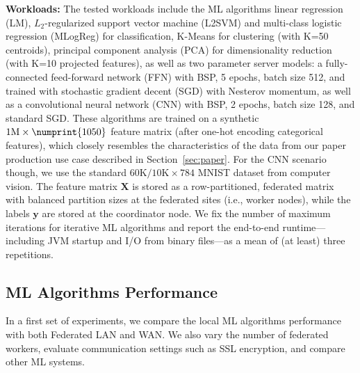 \documentclass[sigconf,screen]{acmart}
\newcommand{\mat}[1]{\ensuremath{\mathbf{#1}}}
\newcommand{\num}[1]{\numprint{#1}}
\begin{document}
\textbf{Workloads:} The tested workloads include the ML algorithms linear regression (LM), $L_2$-regularized support vector machine (L2SVM) and multi-class logistic regression (MLogReg) for classification, K-Means for clustering (with K=50 centroids), principal component analysis (PCA) for dimensionality reduction (with K=10 projected features), as well as two parameter server models: a fully-connected feed-forward network (FFN) with BSP, 5 epochs, batch size 512, and trained with stochastic gradient decent (SGD) with Nesterov momentum, as well as a convolutional neural network (CNN) with BSP, 2 epochs, batch size 128, and standard SGD. These algorithms are trained on a synthetic $1\text{M} \times \num{1050}$ feature matrix (after one-hot encoding categorical features), which closely resembles the characteristics of the data from our paper production use case described in Section~\ref{sec:paper}. For the CNN scenario though, we use the standard $60\text{K}/10\text{K}\times784$ MNIST dataset from computer vision. The feature matrix $\mat{X}$ is stored as a row-partitioned, federated matrix with balanced partition sizes at the federated sites (i.e., worker nodes), while the labels $\mat{y}$ are stored at the coordinator node. We fix the number of maximum iterations for iterative ML algorithms and report the end-to-end runtime---including JVM startup and I/O from binary files---as a mean of (at least) three repetitions.

\subsection{ML Algorithms Performance}
\label{sec:algorithms}

In a first set of experiments, we compare the local ML algorithms performance with both Federated LAN and WAN. We also vary the number of federated workers, evaluate communication settings such as SSL encryption, and compare other ML systems.
\end{document}

